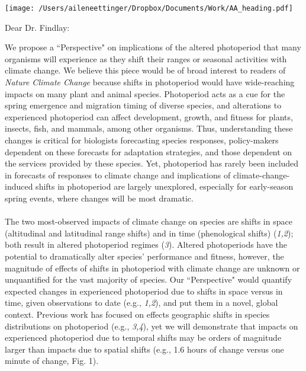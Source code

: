\documentclass[10.5pt,a4paper]{letter}
\begin{document}

\begin{letter}{}
\texttt{[image: /Users/aileneettinger/Dropbox/Documents/Work/AA\_heading.pdf]}

\opening{Dear Dr. Findlay:}
We propose a ``Perspective" on implications of the altered photoperiod that many organisms will experience as they shift their ranges or seasonal activities with climate change. We believe this piece would be of broad interest to readers of \emph{Nature Climate Change} because shifts in photoperiod would have wide-reaching impacts on many plant and animal species. Photoperiod acts as a cue for the spring emergence and migration timing of diverse species, and alterations to experienced photoperiod can affect development, growth, and fitness for plants, insects, fish, and mammals, among other organisms. Thus, understanding these changes is critical for biologists forecasting species responses, policy-makers dependent on these forecasts for adaptation strategies, and those dependent on the services provided by these species. Yet, photoperiod has rarely been included in forecasts of responses to climate change and implications of climate-change-induced shifts in photoperiod are largely unexplored, especially for early-season spring events, where changes will be most dramatic. 
\\
\\
The two most-observed impacts of climate change on species are shifts in space (altitudinal and latitudinal range shifts) and in time (phenological shifts) (\emph{1,2}); both result in altered photoperiod regimes (\emph{3}).  Altered photoperiods have the potential to dramatically alter species' performance and fitness, however, the magnitude of effects of shifts in photoperiod with climate change are unknown or unquantified for the vast majority of species.  Our ``Perspective" would quantify expected changes in experienced photoperiod due to shifts in space versus in time, given observations to date (e.g., \emph{1,2}), and put them in a novel, global context. Previous work has focused on effects geographic shifts in species distributions on photoperiod (e.g., \emph{3,4}), yet we will demonstrate that impacts on experienced photoperiod due to temporal shifts may be orders of magnitude larger than impacts due to spatial shifts (e.g., 1.6 hours of change versus one minute of change, Fig. 1). 
\\
\\

\end{letter}
\end{document}
